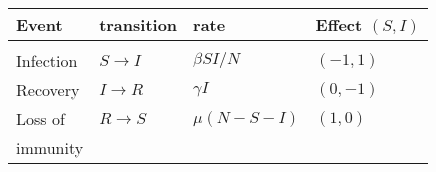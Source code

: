 \documentclass[12pt]{article}
\begin{document}
\begin{center}\begin{tabular}{llll}
   {\bf Event} & {\bf transition} &{\bf rate} &{\bf Effect $(S,I)$}
   \\ \hline
   \\ Infection &$S \to I$  &$\beta SI/N$ & $(-1,1)$
   \\ Recovery & $I \to R$ & $\gamma I$ & $(0,-1)$
   \\ Loss of \vspace{-0.8ex} &  $R \to S$ & $\mu (N-S-I)$ & $(1,0)$
   \\ immunity
\end{tabular}\end{center}
\end{document}
